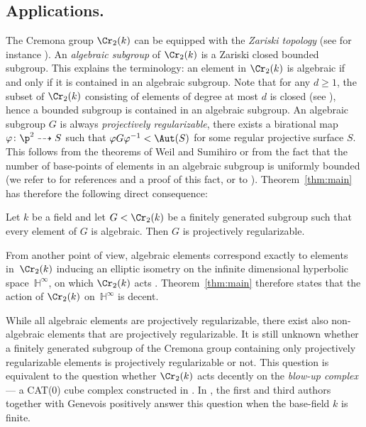 \subsection{Applications.}
The Cremona group $\Cr_2(k)$ can be equipped with the \emph{Zariski topology} (see for instance \cite{Serre_Bourbaki}). An \emph{algebraic subgroup} of $\Cr_2(k)$ is a Zariski closed bounded subgroup. This explains the terminology: an element in $\Cr_2(k)$ is algebraic if and only if it is contained in an algebraic subgroup. Note that for any $d\geq1$, the subset of $\Cr_2(k)$ consisting of elements of degree at most $d$ is closed (see \cite{Blanc_Furter}), hence a bounded subgroup is contained in an algebraic subgroup. An algebraic subgroup $G$ is always \emph{projectively regularizable}, \ie there exists a birational map $\varphi\colon \p^2\dashrightarrow S$ such that $\varphi G\varphi^{-1}<\Aut(S)$ for some regular projective surface $S$. This follows from the theorems of Weil and Sumihiro or from the fact that the number of base-points of elements in an algebraic subgroup is uniformly bounded (we refer to \cite{Lamy_Cremona} for references and a proof of this fact, or to \cite{lonjou2021actions}). Theorem~\ref{thm:main} has therefore the following direct consequence:

\begin{corollary}
\label{cor:main}
{Let $k$ be a field and} let $G<\Cr_2(k)$ be a finitely generated subgroup such that every element of $G$ is algebraic. Then $G$ is projectively regularizable. \end{corollary}

From another point of view, algebraic elements correspond exactly to elements in~$\Cr_2(k)$ inducing an elliptic isometry on the infinite dimensional hyperbolic space~$\mathbb{H}^\infty$, on which $\Cr_2(k)$ acts \cite{Cantat_groupes_birat}. Theorem~\ref{thm:main} therefore states that the action of $\Cr_2(k)$ on~$\mathbb{H}^\infty$ is decent.

While all algebraic elements are projectively regularizable, there exist also non-algebraic elements that are projectively regularizable. It is still unknown whether a finitely generated subgroup of the Cremona group containing only projectively regularizable elements is projectively regularizable or not. This question is equivalent to the question whether $\Cr_2(k)$ acts decently on the \emph{blow-up complex} --- a CAT(0) cube complex constructed in \cite{lonjou2021actions}. In \cite{GLU_Neretin}, the first and third authors together with Genevois positively answer this question when the base-field {$k$} is finite.

